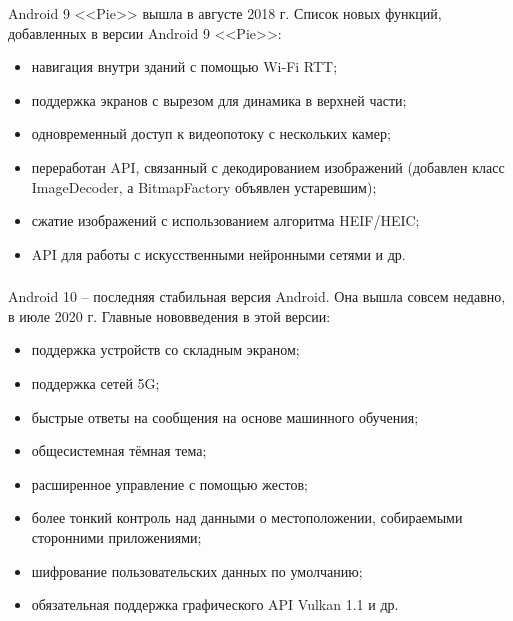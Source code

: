 Android 9 <<Pie>> вышла в августе 2018 г. \cite{android_release_notes}
Список новых функций, добавленных в версии Android 9 <<Pie>>:
\begin{itemize}
	\item навигация внутри зданий с помощью Wi-Fi RTT;
	\item поддержка экранов с вырезом для динамика в верхней части;
	\item одновременный доступ к видеопотоку с нескольких камер;
	\item переработан API, связанный с декодированием изображений (добавлен класс ImageDecoder, а BitmapFactory объявлен устаревшим);
	\item сжатие изображений с использованием алгоритма HEIF/HEIC;
	\item API для работы с искусственными нейронными сетями и др. \cite{android_pie}
\end{itemize}


\subsubsection{}
\label{subsub:android_platform:history:android_10}

Android 10 -- последняя стабильная версия Android.
Она вышла совсем недавно, в июле 2020 г. \cite{android_release_notes}
Главные нововведения в этой версии:
\begin{itemize}
	\item поддержка устройств со складным экраном;
	\item поддержка сетей 5G;
	\item быстрые ответы на сообщения на основе машинного обучения;
	\item общесистемная тёмная тема;
	\item расширенное управление с помощью жестов;
	\item более тонкий контроль над данными о местоположении, собираемыми сторонними приложениями;
	\item шифрование пользовательских данных по умолчанию;
	\item обязательная поддержка графического API Vulkan 1.1 и др. \cite{android_10}
\end{itemize}


\subsubsection{}
\label{subsub:android_platform:history:android_11}

